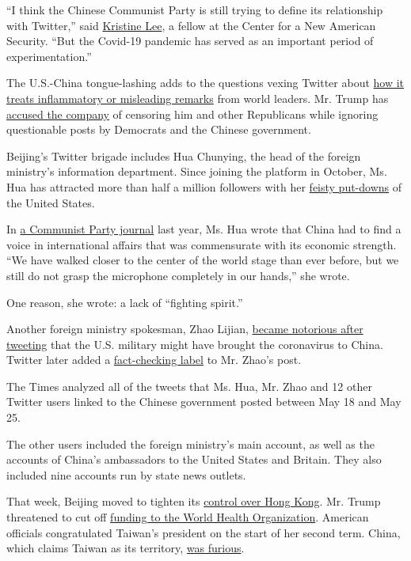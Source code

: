 ``I think the Chinese Communist Party is still trying to define its
relationship with Twitter,'' said
\href{https://www.cnas.org/publications/reports/dangerous-synergies}{Kristine
Lee}, a fellow at the Center for a New American Security. ``But the
Covid-19 pandemic has served as an important period of
experimentation.''

The U.S.-China tongue-lashing adds to the questions vexing Twitter about
\href{https://www.nytimes.com/2020/05/30/technology/twitter-trump-dorsey.html}{how
it treats inflammatory or misleading remarks} from world leaders. Mr.
Trump has
\href{https://twitter.com/realdonaldtrump/status/1266326065833824257}{accused
the company} of censoring him and other Republicans while ignoring
questionable posts by Democrats and the Chinese government.

Beijing's Twitter brigade includes Hua Chunying, the head of the foreign
ministry's information department. Since joining the platform in
October, Ms. Hua has attracted more than half a million followers with
her
\href{https://twitter.com/SpokespersonCHN/status/1266741986096107520}{feisty
put-downs} of the United States.

In \href{https://www.thepaper.cn/newsDetail_forward_3900567}{a Communist
Party journal} last year, Ms. Hua wrote that China had to find a voice
in international affairs that was commensurate with its economic
strength. ``We have walked closer to the center of the world stage than
ever before, but we still do not grasp the microphone completely in our
hands,'' she wrote.

One reason, she wrote: a lack of ``fighting spirit.''

Another foreign ministry spokesman, Zhao Lijian,
\href{https://twitter.com/zlj517/status/1238111898828066823}{became
notorious after tweeting} that the U.S. military might have brought the
coronavirus to China. Twitter later added a
\href{https://www.nytimes.com/2020/05/28/technology/trump-twitter-fact-check.html}{fact-checking
label} to Mr. Zhao's post.

The Times analyzed all of the tweets that Ms. Hua, Mr. Zhao and 12 other
Twitter users linked to the Chinese government posted between May 18 and
May 25.

The other users included the foreign ministry's main account, as well as
the accounts of China's ambassadors to the United States and Britain.
They also included nine accounts run by state news outlets.

That week, Beijing moved to tighten its
\href{https://www.nytimes.com/2020/05/21/world/asia/hong-kong-china.html}{control
over Hong Kong}. Mr. Trump threatened to cut off
\href{https://www.nytimes.com/2020/05/18/health/coronavirus-who-china-trump.html}{funding
to the World Health Organization}. American officials congratulated
Taiwan's president on the start of her second term. China, which claims
Taiwan as its territory,
\href{http://www.xinhuanet.com/english/2020-05/20/c_139072817.htm}{was
furious}.


